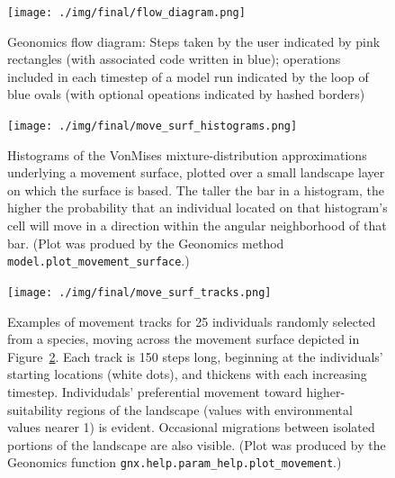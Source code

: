 ﻿\documentclass{article}
\begin{document}
\begin{figure}[ht!]
\texttt{[image: ./img/final/flow\_diagram.png]}
        \caption{Geonomics flow diagram: Steps taken by the user indicated by pink 
                 rectangles (with associated code written in blue);
                 operations included in each timestep of a model run
                 indicated by the loop of blue ovals
                 (with optional opeations indicated by hashed borders)}
        \label{fig:flow}
\end{figure}


\begin{figure}[ht!]
\texttt{[image: ./img/final/move\_surf\_histograms.png]}
        \caption{Histograms of the VonMises mixture-distribution approximations
                 underlying a movement surface, plotted over a small landscape
                 layer on which the surface is based.
                 The taller the bar in a histogram, the higher the probability
                 that an individual located on that histogram's cell will move
                 in a direction within the angular neighborhood of that bar.
                 (Plot was produed by the Geonomics method
                 \texttt{model.plot\_movement\_surface}.)}
        \label{fig:move_surf_hists}
\end{figure}

\begin{figure}[ht!]
\texttt{[image: ./img/final/move\_surf\_tracks.png]}
        \caption{Examples of movement tracks for 25 individuals
                 randomly selected from a species, moving across
                 the movement surface depicted in
                 Figure~\ref{fig:move_surf_hists}.
                 Each track is 150 steps long, beginning at
                 the individuals' starting locations (white dots),
                 and thickens with each increasing timestep.
                 Individudals' preferential movement toward
                 higher-suitability regions of the landscape
                 (values with environmental values nearer 1) is evident.
                 Occasional migrations between isolated portions of the
                 landscape are also visible.
                 (Plot was produced by the Geonomics function
                 \texttt{gnx.help.param\_help.plot\_movement}.)}
        \label{fig:move_surf_tracks}
\end{figure}
\end{document}

